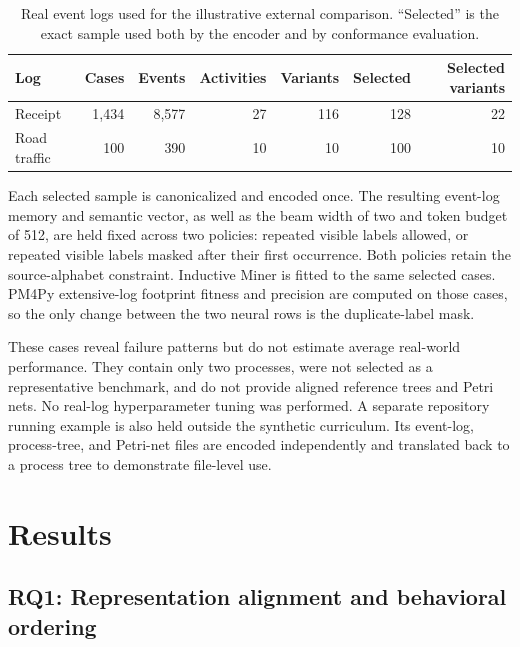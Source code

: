 \documentclass[pdflatex,sn-basic]{sn-jnl}
\newcommand{\RQone}{\textbf{RQ1}}
\begin{document}
\begin{table}[!t]
\centering
\caption{Real event logs used for the illustrative external comparison. ``Selected'' is the exact sample used both by the encoder and by conformance evaluation.}
\label{tab:real-log-data}
\begin{tabular}{@{}lrrrrrr@{}}
\toprule
Log & Cases & Events & Activities & Variants & Selected & Selected variants \\
\midrule
Receipt & 1,434 & 8,577 & 27 & 116 & 128 & 22 \\
Road traffic & 100 & 390 & 10 & 10 & 100 & 10 \\
\bottomrule
\end{tabular}
\end{table}

Each selected sample is canonicalized and encoded once. The resulting event-log memory and semantic vector, as well as the beam width of two and token budget of 512, are held fixed across two policies: repeated visible labels allowed, or repeated visible labels masked after their first occurrence. Both policies retain the source-alphabet constraint. Inductive Miner is fitted to the same selected cases. PM4Py extensive-log footprint fitness and precision are computed on those cases, so the only change between the two neural rows is the duplicate-label mask.

These cases reveal failure patterns but do not estimate average real-world performance. They contain only two processes, were not selected as a representative benchmark, and do not provide aligned reference trees and Petri nets. No real-log hyperparameter tuning was performed. A separate repository running example is also held outside the synthetic curriculum. Its event-log, process-tree, and Petri-net files are encoded independently and translated back to a process tree to demonstrate file-level use.

\FloatBarrier

\section{Results}\label{sec:results}

\subsection{\RQone: Representation alignment and behavioral ordering}
\end{document}
